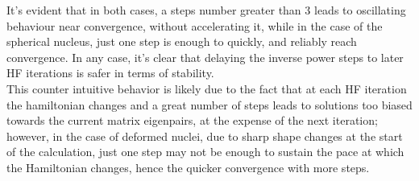 It's evident that in both cases, a steps number greater than $3$ leads to oscillating behaviour near convergence, without accelerating it, while in the case of the spherical nucleus, just one step is enough to quickly, and reliably reach convergence. In any case, it's clear that delaying the inverse power steps to later HF iterations is safer in terms of stability.
\\This counter intuitive behavior is likely due to the fact that at each HF iteration the hamiltonian changes and a great number of steps leads to solutions too biased towards the current matrix eigenpairs, at the expense of the next iteration; however, in the case of deformed nuclei, due to sharp shape changes at the start of the calculation, just one step may not be enough to sustain the pace at which the Hamiltonian changes, hence the quicker convergence with more steps.



